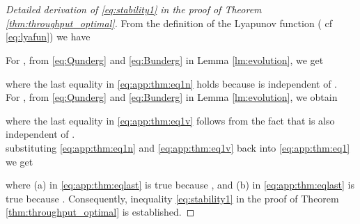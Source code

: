 \documentclass[onecolumn,draftcls]{IEEEtran}
\begin{document}
\section{}
\label{app:thm}
\begin{proof}[Detailed derivation of \eqref{eq:stability1} in the proof of Theorem \ref{thm:throughput_optimal}]
From the definition of the Lyapunov function  ( cf \eqref{eq:lyafun}) we have

For , from \eqref{eq:Qunderg} and \eqref{eq:Bunderg} in Lemma \ref{lm:evolution}, we get

where the last equality in \eqref{eq:app:thm:eq1n} holds because  is independent of .
\\
For , from \eqref{eq:Qunderg} and \eqref{eq:Bunderg} in Lemma \ref{lm:evolution}, we obtain

where the last equality in \eqref{eq:app:thm:eq1v} follows from the fact that  is also independent of .
\\
substituting \eqref{eq:app:thm:eq1n} and \eqref{eq:app:thm:eq1v} back into \eqref{eq:app:thm:eq1} we get

where (a) in \eqref{eq:app:thm:eqlast} is true because , and (b) in \eqref{eq:app:thm:eqlast} is true because .
Consequently, inequality \eqref{eq:stability1} in the proof of Theorem \ref{thm:throughput_optimal} is established.
\end{proof}
\end{document}
